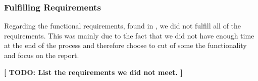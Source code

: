 \subsubsection{Fulfilling Requirements}
Regarding the functional requirements, found in , we did not fulfill all of the requirements. This was mainly due to the fact that we did not have enough time at the end of the process and therefore choose to cut of some the functionality and focus on the report.

\textbf{[ TODO: List the requirements we did not meet. ]}